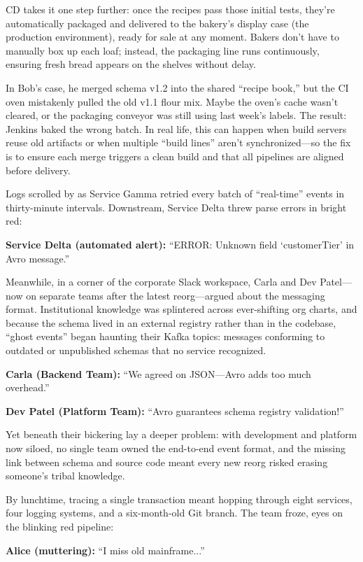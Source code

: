 CD takes it one step further: once the recipes pass those initial tests, 
they’re automatically packaged and delivered to the bakery’s display case 
(the production environment), ready for sale at any moment. Bakers don’t 
have to manually box up each loaf; instead, the packaging line runs 
continuously, ensuring fresh bread appears on the shelves without delay.

In Bob’s case, he merged schema v1.2 into the shared “recipe book,” but 
the CI oven mistakenly pulled the old v1.1 flour mix. Maybe the oven’s 
cache wasn’t cleared, or the packaging conveyor was still using 
last week’s labels. The result: Jenkins baked the wrong batch. In real 
life, this can happen when build servers reuse old artifacts or when 
multiple “build lines” aren’t synchronized—so the fix is to ensure 
each merge triggers a clean build and that all pipelines are aligned 
before delivery.  

Logs scrolled by as Service Gamma retried every batch of “real-time” events  
in thirty-minute intervals. Downstream, Service Delta threw parse errors in  
bright red:

\textbf{Service Delta (automated alert):} “ERROR: Unknown field ‘customerTier’  
in Avro message.”

Meanwhile, in a corner of the corporate Slack workspace, Carla and Dev Patel—now on  
separate teams after the latest reorg—argued about the messaging format. Institutional  
knowledge was splintered across ever-shifting org charts, and because the schema  
lived in an external registry rather than in the codebase, “ghost events” began  
haunting their Kafka topics: messages conforming to outdated or unpublished schemas  
that no service recognized.

\textbf{Carla (Backend Team):} “We agreed on JSON—Avro adds too much overhead.”

\textbf{Dev Patel (Platform Team):} “Avro guarantees schema registry validation!”

Yet beneath their bickering lay a deeper problem: with development and platform now  
siloed, no single team owned the end-to-end event format, and the missing link between  
schema and source code meant every new reorg risked erasing someone’s tribal knowledge.  

By lunchtime, tracing a single transaction meant hopping through eight services,  
four logging systems, and a six-month-old Git branch. The team froze, eyes on  
the blinking red pipeline:

\textbf{Alice (muttering):} “I miss old mainframe...”



